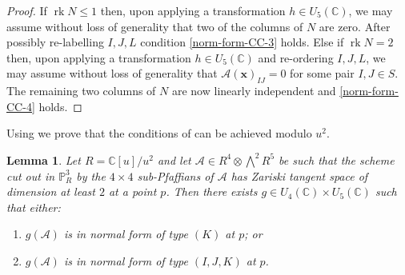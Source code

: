\documentclass[11pt]{amsart}
\numberwithin{theorem}{section}
\numberwithin{equation}{section}
\newtheorem{lemma}[theorem]{Lemma}
\theoremstyle{definition}\newtheorem{defn}[theorem]{Definition}
\theoremstyle{definition}\newtheorem{remark}[theorem]{Remark}
\theoremstyle{definition}\newtheorem{question}[theorem]{Question}
\theoremstyle{definition}\newtheorem{problem}[theorem]{Problem}
\newcommand{\CC}{\mathbb{C}}
\newcommand{\PP}{\mathbb{P}}
\newcommand{\cA}{\mathcal{A}}
\DeclareMathOperator{\rank}{rk}
\newcommand{\I}{I}
\newcommand{\J}{J}
\newcommand{\K}{K}
\renewcommand{\L}{L}
\begin{document}
\begin{proof}
If $\rank N \leq 1$ then, upon applying a transformation $h \in U_5(\CC)$, we may assume without loss of generality that two of the columns of $N$ are zero. After possibly re-labelling $\I,\J,\L$  condition \ref{norm-form-CC-3} holds. 
Else if $\rank N = 2$ then, upon applying a transformation $h \in U_5(\CC)$ and re-ordering $\I,\J,\L$, we may assume without loss of generality that $\cA(\mathbf{x})_{\I\J} = 0$ for some pair $\I,\J \in S$. The remaining two columns of $N$ are now linearly independent and \ref{norm-form-CC-4} holds.
\end{proof}

Using  we prove that the conditions of  can be achieved modulo $u^2$.

\begin{lemma}
  \label{lemma:divisibility}
  Let $R = \CC[u]/u^2$ and let ${\cA} \in R^4 \otimes \bigwedge^2 R^5$ be such that the scheme cut out in $\PP^3_R$ by the $4 \times 4$ sub-Pfaffians of $\cA$ has Zariski tangent space of dimension at least $2$ at a point ${p}$. Then there exists $g \in U_4(\CC) \times U_5(\CC)$ such that either:
  \begin{enumerate}[label=(\Alph*)]
    \item $g(\cA)$ is in normal form of type $(\K)$ at $p$; or 
      \item $g (\cA)$ is in normal form of type $(\I, \J, \K)$ at $p$.
  \end{enumerate}
\end{lemma} 
\end{document}
